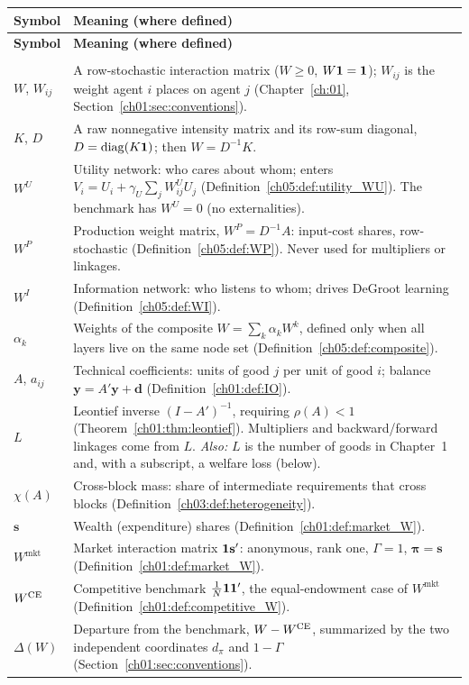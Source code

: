 {\small
\begin{longtable}{@{}>{\raggedright\arraybackslash}p{3.2cm}>{\raggedright\arraybackslash}p{11.3cm}@{}}
\toprule
\textbf{Symbol} & \textbf{Meaning (where defined)} \\
\midrule
\endfirsthead
\toprule
\textbf{Symbol} & \textbf{Meaning (where defined)} \\
\midrule
\endhead
\bottomrule
\endfoot

\multicolumn{2}{@{}l}{\textit{Weight matrices}} \\[2pt]
$W$, $W_{ij}$ & A row-stochastic interaction matrix ($W \ge 0$, $W\mathbf{1} = \mathbf{1}$); $W_{ij}$ is the weight agent $i$ places on agent $j$ (Chapter~\ref{ch:01}, Section~\ref{ch01:sec:conventions}). \\
$K$, $D$ & A raw nonnegative intensity matrix and its row-sum diagonal, $D = \operatorname{diag}(K\mathbf{1})$; then $W = D^{-1}K$. \\
$W^U$ & Utility network: who cares about whom; enters $V_i = U_i + \gamma_U\sum_j W^U_{ij}U_j$ (Definition~\ref{ch05:def:utility_WU}). The benchmark has $W^U = 0$ (no externalities). \\
$W^P$ & Production weight matrix, $W^P = D^{-1}A$: input-cost shares, row-stochastic (Definition~\ref{ch05:def:WP}). Never used for multipliers or linkages. \\
$W^I$ & Information network: who listens to whom; drives DeGroot learning (Definition~\ref{ch05:def:WI}). \\
$\alpha_k$ & Weights of the composite $W = \sum_k \alpha_k W^k$, defined only when all layers live on the same node set (Definition~\ref{ch05:def:composite}). \\
$A$, $a_{ij}$ & Technical coefficients: units of good $j$ per unit of good $i$; balance $\mathbf{y} = A'\mathbf{y} + \mathbf{d}$ (Definition~\ref{ch01:def:IO}). \\
$L$ & Leontief inverse $(I - A')^{-1}$, requiring $\rho(A) < 1$ (Theorem~\ref{ch01:thm:leontief}). Multipliers and backward/forward linkages come from $L$. \textit{Also:} $L$ is the number of goods in Chapter~1 and, with a subscript, a welfare loss (below). \\
$\chi(A)$ & Cross-block mass: share of intermediate requirements that cross blocks (Definition~\ref{ch03:def:heterogeneity}). \\
$\mathbf{s}$ & Wealth (expenditure) shares (Definition~\ref{ch01:def:market_W}). \\
$W^{\text{mkt}}$ & Market interaction matrix $\mathbf{1}\mathbf{s}'$: anonymous, rank one, $\Gamma = 1$, $\boldsymbol{\pi} = \mathbf{s}$ (Definition~\ref{ch01:def:market_W}). \\
$W^{\text{CE}}$ & Competitive benchmark $\frac{1}{N}\mathbf{1}\mathbf{1}'$, the equal-endowment case of $W^{\text{mkt}}$ (Definition~\ref{ch01:def:competitive_W}). \\
$\Delta(W)$ & Departure from the benchmark, $W - W^{\text{CE}}$, summarized by the two independent coordinates $d_\pi$ and $1 - \Gamma$ (Section~\ref{ch01:sec:conventions}). \\[4pt]


\end{longtable}}
